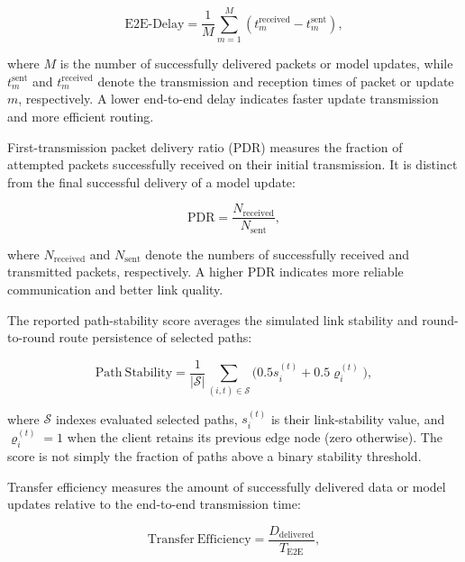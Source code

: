 \documentclass[5p,times,numafflabel]{elsarticle}
\begin{document}
	\begin{equation}
		\mathrm{E2E\mbox{-}Delay}
		=
		\frac{1}{M}
		\sum_{m=1}^{M}
		\left(
		t_{m}^{\mathrm{received}}
		-
		t_{m}^{\mathrm{sent}}
		\right),
		\label{eq:e2e-delay}
	\end{equation}
	
	where \(M\) is the number of successfully delivered packets or model
	updates, while \(t_{m}^{\mathrm{sent}}\) and
	\(t_{m}^{\mathrm{received}}\) denote the transmission and reception
	times of packet or update \(m\), respectively. A lower end-to-end
	delay indicates faster update transmission and more efficient
	routing.
	

First-transmission packet delivery ratio (PDR) measures the fraction
of attempted packets successfully received on their initial
transmission. It is distinct from the final successful delivery
of a model update:

	
	\begin{equation}
		\mathrm{PDR}
		=
		\frac{N_{\mathrm{received}}}
		{N_{\mathrm{sent}}},
		\label{eq:pdr}
	\end{equation}
	
	where \(N_{\mathrm{received}}\) and \(N_{\mathrm{sent}}\) denote the
	numbers of successfully received and transmitted packets,
	respectively. A higher PDR indicates more reliable communication and
	better link quality.
	
	
	The reported path-stability score averages the simulated link
	stability and round-to-round route persistence of selected paths:
	
	\begin{equation}
		\mathrm{Path\ Stability}
		=\frac{1}{|\mathcal{S}|}\sum_{(i,t)\in\mathcal{S}}
		\bigl(0.5s_i^{(t)}+0.5\varrho_i^{(t)}\bigr),
		\label{eq:path-stability}
	\end{equation}
	
	where \(\mathcal{S}\) indexes evaluated selected paths,
	\(s_i^{(t)}\) is their link-stability value, and
	\(\varrho_i^{(t)}=1\) when the client retains its previous
	edge node (zero otherwise). The score is not simply the
	fraction of paths above a binary stability threshold.
	
	
	Transfer efficiency measures the amount of successfully delivered
	data or model updates relative to the end-to-end transmission time:
	
	\begin{equation}
		\mathrm{Transfer\ Efficiency}
		=
		\frac{D_{\mathrm{delivered}}}
		{T_{\mathrm{E2E}}},
		\label{eq:transfer-efficiency}
	\end{equation}
	
\end{document}
